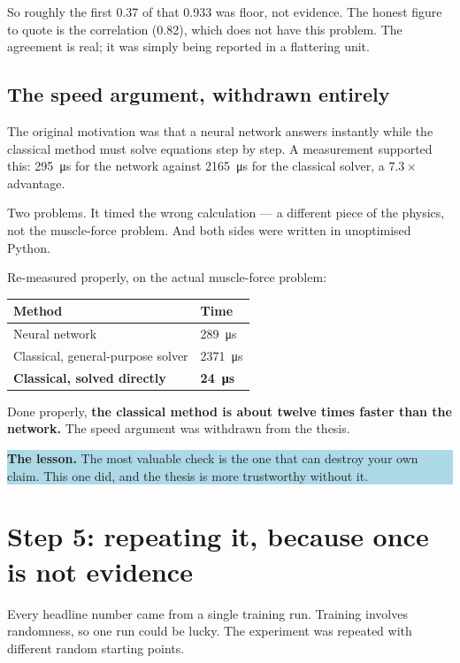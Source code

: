 \documentclass[11pt, a4paper]{article}
\newcommand{\lesson}[1]{%
  \par\vspace{4pt}%
  \noindent\colorbox{lightblue}{\parbox{\dimexpr\linewidth-2\fboxsep}{%
  \textbf{The lesson.} #1}}\par\vspace{4pt}}
\begin{document}
So roughly the first 0.37 of that 0.933 was floor, not evidence. The honest
figure to quote is the correlation (0.82), which does not have this problem. The
agreement is real; it was simply being reported in a flattering unit.

\subsection{The speed argument, withdrawn entirely}

The original motivation was that a neural network answers instantly while the
classical method must solve equations step by step. A measurement supported this:
\SI{295}{\micro\second} for the network against \SI{2165}{\micro\second} for the
classical solver, a $7.3\times$ advantage.

Two problems. It timed the wrong calculation --- a different piece of the physics,
not the muscle-force problem. And both sides were written in unoptimised Python.

Re-measured properly, on the actual muscle-force problem:

\begin{table}[h]
\centering
\begin{tabular}{@{} L{8.0cm} R{3.0cm} @{}}
\toprule
\textbf{Method} & \textbf{Time} \\
\midrule
Neural network & \SI{289}{\micro\second} \\
Classical, general-purpose solver & \SI{2371}{\micro\second} \\
\textbf{Classical, solved directly} & \textbf{\SI{24}{\micro\second}} \\
\bottomrule
\end{tabular}
\end{table}

Done properly, \textbf{the classical method is about twelve times faster than the
network.} The speed argument was withdrawn from the thesis.

\lesson{The most valuable check is the one that can destroy your own claim. This
one did, and the thesis is more trustworthy without it.}

\section{Step 5: repeating it, because once is not evidence}

Every headline number came from a single training run. Training involves
randomness, so one run could be lucky. The experiment was repeated with different
random starting points.
\end{document}
